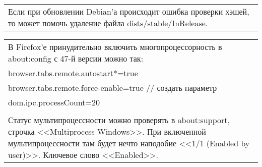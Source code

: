 \documentclass[14pt,openany]{book}
\begin{document}
\begin{center}
\begin{tabular}{|p{\textwidth}|}
\hline
Если при обновлении Debian'а происходит ошибка проверки хэшей, то может помочь удаление файла dists/stable/InRelease. \\
\end{tabular}
\begin{tabular}{|p{\textwidth}|}
\hline
В Firefox'е принудительно включить многопроцессорность в about:config с 47-й версии можно так: \\
browser.tabs.remote.autostart*=true \\
browser.tabs.remote.force-enable=true // создать параметр \\
dom.ipc.processCount=20 \\
 \\
Статус мультипроцессности можно проверять в about:support, строчка <<Multiprocess Windows>>. При включенной мультипроцессности там будет нечто наподобие <<1/1 (Enabled by user)>>. Ключевое слово <<Enabled>>. \\
\hline
\end{tabular}
\end{center}  
\end{document}

